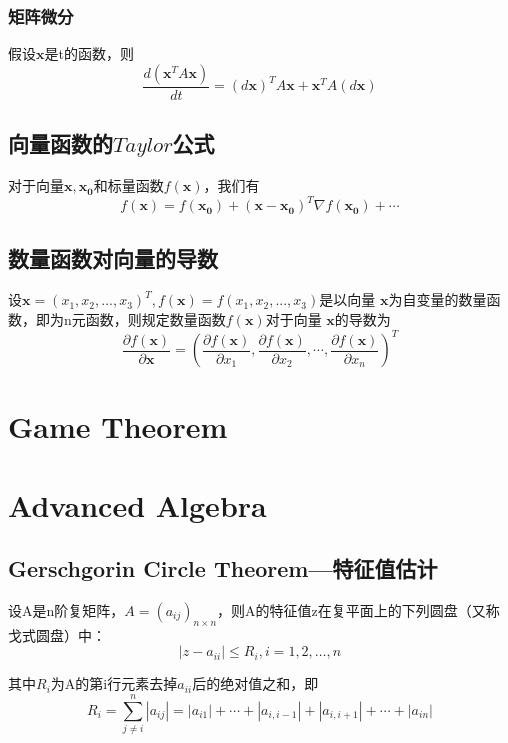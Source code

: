 \documentclass[lang=cn,10pt]{elegantbook}
\newcommand\bv[1]{\boldsymbol{#1}}
\begin{document}
\subsection{矩阵微分}
\begin{corollary}
	假设$\mathbf{x}$是t的函数，则
	\begin{equation}
		\frac{d(\mathbf{x}^TA\mathbf{x})}{dt} = (d\mathbf{x})^TA\mathbf{x} + \mathbf{x}^TA(d\mathbf{x})
	\end{equation}
\end{corollary}



\section{向量函数的$Taylor$公式}\label{eq4.1}
对于向量$\bv{x,x_0}$和标量函数$f(\bv{x})$，我们有
\begin{equation}
	f(\bv{x}) = f(\bv{x_0}) + (\bv{x-x_0})^T\nabla f(\bv{x_0}) + \cdots
\end{equation}

\section{数量函数对向量的导数}
\begin{definition}
	设$\bv{x} = (x_1,x_2,...,x_3)^T,f(\bv{x})=f(x_1,x_2,...,x_3)$是以向量
	$\bv{x}$为自变量的数量函数，即为n元函数，则规定数量函数$f(\bv{x})$对于向量
	$\bv{x}$的导数为
	\begin{equation}
		\frac{\partial f(\bv{x})}{\partial \bv{x}} = \left(\frac{\partial f(\bv{x})}{\partial x_1},
		\frac{\partial f(\bv{x})}{\partial x_2},\cdots,\frac{\partial f(\bv{x})}{\partial x_n}\right)^T
	\end{equation}
\end{definition}


\chapter{Game Theorem}



\chapter{Advanced Algebra}
\section{Gerschgorin Circle Theorem—特征值估计\label{Gerschgorin}}
\begin{theorem}[圆盘第一定理]\label{Gerschgorin1}
	设A是n阶复矩阵，$A=(a_{ij})_{n \times n}$，则A的特征值z在复平面上的下列圆盘（又称戈式圆盘）中：
	\begin{equation*}
		|z-a_{ii}|\leq R_i,i=1,2,\ldots,n
	\end{equation*}
	\par 其中$R_i$为A的第i行元素去掉$a_{ii}$后的绝对值之和，即
	\begin{equation*}
		R_i=\sum_{j\neq i}^n|a_{ij}|=|a_{i1}|+\cdots+|a_{i,i-1}|+|a_{i,i+1}|+\cdots+|a_{in}|
	\end{equation*}
\end{theorem}
\end{document}
